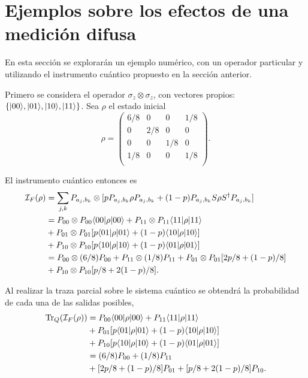 {%
\section{Ejemplos sobre los efectos de una medición difusa} %

En esta sección se explorarán un ejemplo numérico, con un operador particular y utilizando el instrumento cuántico propuesto en la sección anterior.


Primero se considera el operador $\sigma_z \otimes \sigma_z$, con vectores propios: $\{|00\rangle, |01\rangle, |10\rangle, |11\rangle\}$. Sea $\rho $ el estado inicial
\[\rho={\begin{pmatrix}6/8&0&0 &1/8\\0&2/8&0 &0\\0 &0 &1/8 &0 \\1/8&0&0&1/8\\\end{pmatrix}}.\]

El instrumento cuántico entonces es
\begin{equation}\label{primer_alternativa_ejemplo}
    \begin{split}
        \mathcal{I}_F(\rho)&=\sum_{j,k}P_{a_j,b_k}\otimes[p P_{a_j,b_k}\rho P_{a_j,b_k}+(1-p)P_{a_j,b_k}S\rho S^\dagger P_{a_j,b_k}]\\
        &=P_{00}\otimes P_{00} \langle 00|\rho|00\rangle + P_{11}\otimes P_{11} \langle 11|\rho|11\rangle\\
        &+P_{01} \otimes P_{01}[p \langle 01|\rho|01\rangle+(1-p)\langle 10|\rho|10\rangle]\\
        &+P_{10} \otimes P_{10}[p \langle 10|\rho|10\rangle+(1-p)\langle 01|\rho|01\rangle]\\
        &=P_{00}\otimes (6/8)P_{00} + P_{11}\otimes (1/8)P_{11}+P_{01} \otimes P_{01}[2p/8 +(1-p)/8]\\
        &+P_{10} \otimes P_{10}[p/8+2(1-p)/8].\\
    \end{split}
\end{equation}


Al realizar la traza parcial sobre le sistema cuántico se obtendrá la probabilidad de cada una de las salidas posibles, \begin{equation}\label{traza_S1_ejemplo1}
    \begin{split}
        {\rm Tr}_Q(\mathcal{I}_F(\rho)) &= P_{00} \langle 00|\rho|00\rangle + P_{11} \langle 11|\rho|11\rangle\\
        &+P_{01}[p \langle 01|\rho|01\rangle+(1-p)\langle 10|\rho|10\rangle]\\
        &+P_{10}[p \langle 10|\rho|10\rangle+(1-p)\langle 01|\rho|01\rangle]\\
        &=(6/8)P_{00} + (1/8)P_{11}\\
        &+[2p/8 +(1-p)/8]P_{01}+ [p/8+2(1-p)/8]P_{10}.\\
    \end{split}
\end{equation}

}
